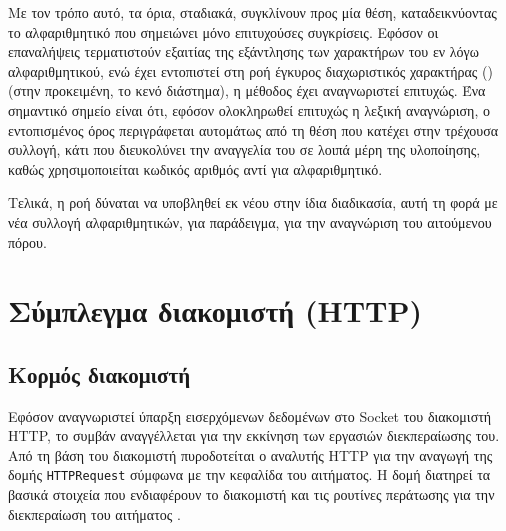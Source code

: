 Με τον τρόπο αυτό, τα όρια, σταδιακά, συγκλίνουν προς μία θέση, καταδεικνύοντας
το αλφαριθμητικό που σημειώνει μόνο επιτυχούσες συγκρίσεις. Εφόσον οι
επαναλήψεις τερματιστούν εξαιτίας της εξάντλησης των χαρακτήρων του εν λόγω
αλφαριθμητικού, ενώ έχει εντοπιστεί στη ροή έγκυρος διαχωριστικός χαρακτήρας
() (στην προκειμένη, το κενό διάστημα), η μέθοδος έχει
αναγνωριστεί επιτυχώς. Ένα σημαντικό σημείο είναι ότι, εφόσον ολοκληρωθεί
επιτυχώς η λεξική αναγνώριση, ο εντοπισμένος όρος περιγράφεται αυτομάτως από τη
θέση που κατέχει στην τρέχουσα συλλογή, κάτι που διευκολύνει την αναγγελία του
σε λοιπά μέρη της υλοποίησης, καθώς χρησιμοποιείται κωδικός αριθμός αντί για
αλφαριθμητικό.

Τελικά, η ροή δύναται να υποβληθεί εκ νέου στην ίδια διαδικασία, αυτή τη φορά με
νέα συλλογή αλφαριθμητικών, για παράδειγμα, για την αναγνώριση του αιτούμενου
πόρου.



\section{Σύμπλεγμα διακομιστή (HTTP)}



\subsection{Κορμός διακομιστή}
Εφόσον αναγνωριστεί ύπαρξη εισερχόμενων δεδομένων στο Socket του διακομιστή
HTTP, το συμβάν αναγγέλλεται για την εκκίνηση των εργασιών διεκπεραίωσης του.
Από τη βάση του διακομιστή πυροδοτείται ο αναλυτής HTTP για την αναγωγή της
δομής \verb~HTTPRequest~ σύμφωνα με την κεφαλίδα του αιτήματος.
Η δομή διατηρεί τα βασικά στοιχεία που ενδιαφέρουν το διακομιστή και τις
ρουτίνες περάτωσης για την διεκπεραίωση του αιτήματος
.


